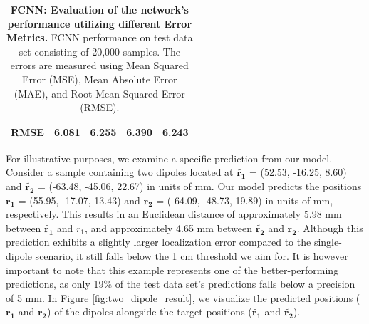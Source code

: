 \documentclass[a4paper, UKenglish, 11pt]{uiomaster}
\begin{document}
\begin{table}[!htb]
\begin{tabular}{l|cccc|}
\multicolumn{1}{|l|}{\cellcolor[HTML]{EFEFEF}RMSE} & \multicolumn{1}{c|}{6.081}                                                                                  & \multicolumn{1}{c|}{6.255}                                                                                   & \multicolumn{1}{c|}{6.390}                                                                                   & 6.243                                                                                                              \\ \hline
\end{tabular}
\caption{\textbf{FCNN: Evaluation of the network's performance utilizing different Error Metrics.} \newline
FCNN performance on test data set consisting of 20,000 samples. The errors are measured using Mean Squared Error (MSE), Mean Absolute Error (MAE), and Root Mean Squared Error (RMSE).}
\label{table:error_multiple_dipoles-1}
\end{table}

For illustrative purposes, we examine a specific prediction from our model. Consider a sample containing two dipoles located at $\tilde{\mathbf{r_1}}$ = (52.53, -16.25, 8.60) and $\tilde{\mathbf{r_2}}$ = (-63.48, -45.06, 22.67) in units of mm. Our model predicts the positions $\mathbf{r_1}$ = (55.95, -17.07, 13.43) and $\mathbf{r_2}$ = (-64.09, -48.73, 19.89) in units of mm, respectively. This results in an Euclidean distance of approximately 5.98 mm between $\tilde{\mathbf{r_1}}$ and $r_1$, and approximately 4.65 mm between $\tilde{\mathbf{r_2}}$ and $\mathbf{r_2}$. Although this prediction exhibits a slightly larger localization error compared to the single-dipole scenario, it still falls below the 1 cm threshold we aim for.
It is however important to note that this example represents one of the better-performing predictions, as only 19$\%$ of the test data set's predictions falls below a precision of 5 mm. In Figure \ref{fig:two_dipole_result}, we visualize the predicted positions ($\mathbf{r_1}$ and $\mathbf{r_2}$) of the dipoles alongside the target positions ($\mathbf{\tilde{r_1}}$ and $\mathbf{\tilde{r_2}}$).
\end{document}
